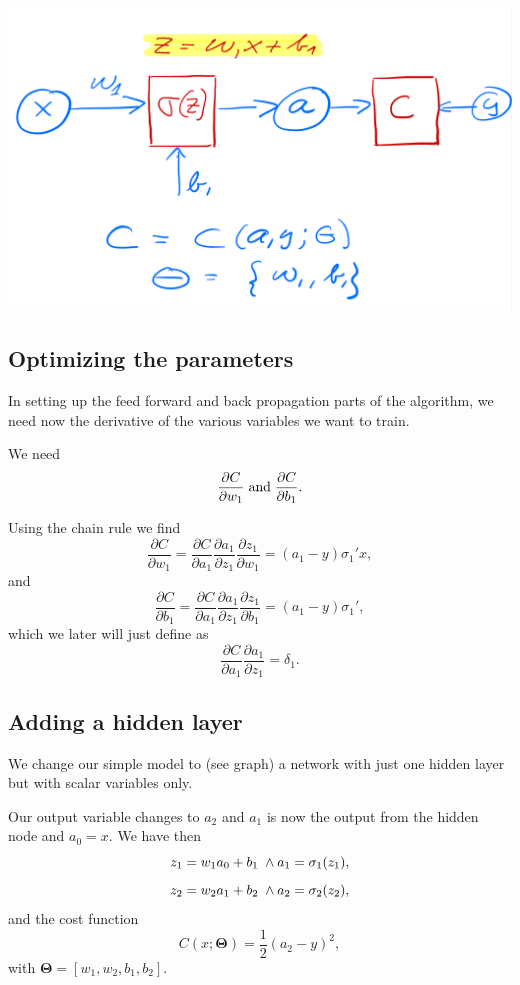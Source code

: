 \documentclass[%
oneside,                 %
final,                   %
10pt]{article}
\begin{document}
\centerline{\includegraphics[width=1.0\linewidth]{figures/simplenn1.png}}

\vspace{6mm}

\subsection{Optimizing the parameters}

In setting up the feed forward and back propagation parts of the
algorithm, we need now the derivative of the various variables we want
to train.

We need
\[
\frac{\partial C}{\partial w_1} \hspace{0.1cm}\mathrm{and}\hspace{0.1cm}\frac{\partial C}{\partial b_1}. 
\]

Using the chain rule we find 
\[
\frac{\partial C}{\partial w_1}=\frac{\partial C}{\partial a_1}\frac{\partial a_1}{\partial z_1}\frac{\partial z_1}{\partial w_1}=(a_1-y)\sigma_1'x,
\]
and
\[
\frac{\partial C}{\partial b_1}=\frac{\partial C}{\partial a_1}\frac{\partial a_1}{\partial z_1}\frac{\partial z_1}{\partial b_1}=(a_1-y)\sigma_1',
\]
which we later will just define as
\[
\frac{\partial C}{\partial a_1}\frac{\partial a_1}{\partial z_1}=\delta_1.
\]

\subsection{Adding a hidden layer}

We change our simple model to (see graph)
a network with just one hidden layer but with scalar variables only.

Our output variable changes to $a_2$ and $a_1$ is now the output from the hidden node and $a_0=x$.
We have then
\[
z_1 = w_1a_0+b_1 \hspace{0.1cm} \wedge a_1 = \sigma_1(z_1),
\]
\[
z_2 = w_2a_1+b_2 \hspace{0.1cm} \wedge a_2 = \sigma_2(z_2),
\]
and the cost function
\[
C(x;\bm{\Theta})=\frac{1}{2}(a_2-y)^2,
\]
with $\bm{\Theta}=[w_1,w_2,b_1,b_2]$.
\end{document}
